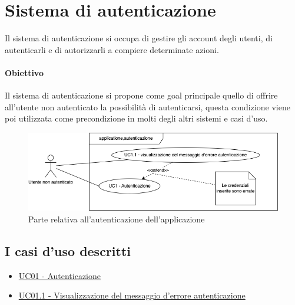 
\section{Sistema di autenticazione}

Il sistema di autenticazione si occupa di gestire gli account degli utenti, di autenticarli e di autorizzarli a compiere determinate azioni.

\paragraph{Obiettivo} Il sistema di autenticazione si propone come goal principale quello di offrire all'utente non autenticato la possibilità di autenticarsi, questa condizione viene poi utilizzata come precondizione in molti degli altri sistemi e casi d'uso.

\begin{figure}[h]
    \includegraphics[width=\textwidth]{contenuti/img/casi_uso_grafici-applicazione,autenticazione.png}
    \caption{Parte relativa all'autenticazione dell'applicazione}
    \label{fig:autenticazione}
\end{figure}

\subsection{I casi d'uso descritti}

\begin{itemize}
    \item \hyperref[uc:01]{UC01 - Autenticazione}
    \item \hyperref[uc:01.1]{UC01.1 - Visualizzazione del messaggio d'errore autenticazione}
\end{itemize}